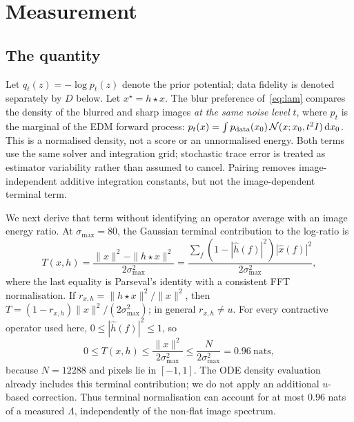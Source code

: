 \documentclass[10pt,journal]{IEEEtran}
\newcommand{\blur}{\star}
\newcommand{\Lam}{\Lambda}
\begin{document}
\section{Measurement}
\label{sec:measurement}

\subsection{The quantity}

Let $q_t(z)=-\log p_t(z)$ denote the prior potential; data fidelity is denoted separately by
$D$ below. Let $x^\blur=h\blur x$. The blur preference of~\eqref{eq:lam} compares the density
of the blurred and sharp images \emph{at the same noise level} $t$, where $p_t$ is the marginal
of the EDM forward process:
$p_t(x)=\int p_{\rm data}(x_0)\,\mathcal N(x;x_0,t^2I)\,\mathrm dx_0$.
This is a normalised density, not a score or an unnormalised energy. Both terms use the same
solver and integration grid; stochastic trace error is treated as estimator variability rather
than assumed to cancel. Pairing removes image-independent additive integration constants, but
not the image-dependent terminal term.

We next derive that term without identifying an operator average with an image energy ratio.
At $\sigma_{\max}=80$, the Gaussian terminal contribution to the log-ratio is
\begin{equation}
  T(x,h)=\frac{\|x\|^2-\|h\blur x\|^2}{2\sigma_{\max}^2}
  =\frac{\sum_f(1-|\hat h(f)|^2)|\hat x(f)|^2}
         {2\sigma_{\max}^2},
  \label{eq:terminal}
\end{equation}
where the last equality is Parseval's identity with a consistent FFT normalisation. If
$r_{x,h}=\|h\blur x\|^2/\|x\|^2$, then $T=(1-r_{x,h})\|x\|^2/(2\sigma_{\max}^2)$; in general
$r_{x,h}\ne u$. For every contractive operator used here, $0\le|\hat h(f)|^2\le1$, so
\begin{equation}
  0\le T(x,h)\le \frac{\|x\|^2}{2\sigma_{\max}^2}
  \le\frac{N}{2\sigma_{\max}^2}=0.96\ \text{nats},
  \label{eq:terminal_bound}
\end{equation}
because $N=12288$ and pixels lie in $[-1,1]$. The ODE density evaluation already includes this
terminal contribution; we do not apply an additional $u$-based correction. Thus terminal
normalisation can account for at most $0.96$ nats of a measured $\Lam$, independently of the
non-flat image spectrum.
\end{document}
